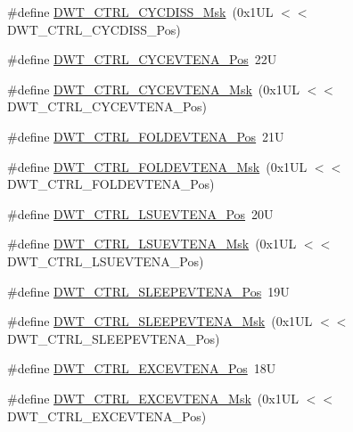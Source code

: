 \begin{DoxyCompactItemize}
\item 
\#define \mbox{\hyperlink{group___c_m_s_i_s___d_w_t_ga688a3b9ecd2a044f2da3280367476271}{D\+W\+T\+\_\+\+C\+T\+R\+L\+\_\+\+C\+Y\+C\+D\+I\+S\+S\+\_\+\+Msk}}~(0x1\+U\+L $<$$<$ D\+W\+T\+\_\+\+C\+T\+R\+L\+\_\+\+C\+Y\+C\+D\+I\+S\+S\+\_\+\+Pos)
\item 
\#define \mbox{\hyperlink{group___c_m_s_i_s___d_w_t_ga0cb0640aaeb18a626d7823570d5c3cb6}{D\+W\+T\+\_\+\+C\+T\+R\+L\+\_\+\+C\+Y\+C\+E\+V\+T\+E\+N\+A\+\_\+\+Pos}}~22U
\item 
\#define \mbox{\hyperlink{group___c_m_s_i_s___d_w_t_ga40554bd81460e39abf08810f45fac1a2}{D\+W\+T\+\_\+\+C\+T\+R\+L\+\_\+\+C\+Y\+C\+E\+V\+T\+E\+N\+A\+\_\+\+Msk}}~(0x1\+U\+L $<$$<$ D\+W\+T\+\_\+\+C\+T\+R\+L\+\_\+\+C\+Y\+C\+E\+V\+T\+E\+N\+A\+\_\+\+Pos)
\item 
\#define \mbox{\hyperlink{group___c_m_s_i_s___d_w_t_ga5602b0707f446ce78d88ff2a3a82bfff}{D\+W\+T\+\_\+\+C\+T\+R\+L\+\_\+\+F\+O\+L\+D\+E\+V\+T\+E\+N\+A\+\_\+\+Pos}}~21U
\item 
\#define \mbox{\hyperlink{group___c_m_s_i_s___d_w_t_ga717e679d775562ae09185a3776b1582f}{D\+W\+T\+\_\+\+C\+T\+R\+L\+\_\+\+F\+O\+L\+D\+E\+V\+T\+E\+N\+A\+\_\+\+Msk}}~(0x1\+U\+L $<$$<$ D\+W\+T\+\_\+\+C\+T\+R\+L\+\_\+\+F\+O\+L\+D\+E\+V\+T\+E\+N\+A\+\_\+\+Pos)
\item 
\#define \mbox{\hyperlink{group___c_m_s_i_s___d_w_t_gaea5d1ee72188dc1d57b54c60a9f5233e}{D\+W\+T\+\_\+\+C\+T\+R\+L\+\_\+\+L\+S\+U\+E\+V\+T\+E\+N\+A\+\_\+\+Pos}}~20U
\item 
\#define \mbox{\hyperlink{group___c_m_s_i_s___d_w_t_gac47427f455fbc29d4b6f8a479169f2b2}{D\+W\+T\+\_\+\+C\+T\+R\+L\+\_\+\+L\+S\+U\+E\+V\+T\+E\+N\+A\+\_\+\+Msk}}~(0x1\+U\+L $<$$<$ D\+W\+T\+\_\+\+C\+T\+R\+L\+\_\+\+L\+S\+U\+E\+V\+T\+E\+N\+A\+\_\+\+Pos)
\item 
\#define \mbox{\hyperlink{group___c_m_s_i_s___d_w_t_ga9c6d62d121164013a8e3ee372f17f3e5}{D\+W\+T\+\_\+\+C\+T\+R\+L\+\_\+\+S\+L\+E\+E\+P\+E\+V\+T\+E\+N\+A\+\_\+\+Pos}}~19U
\item 
\#define \mbox{\hyperlink{group___c_m_s_i_s___d_w_t_ga2f431b3734fb840daf5b361034856da9}{D\+W\+T\+\_\+\+C\+T\+R\+L\+\_\+\+S\+L\+E\+E\+P\+E\+V\+T\+E\+N\+A\+\_\+\+Msk}}~(0x1\+U\+L $<$$<$ D\+W\+T\+\_\+\+C\+T\+R\+L\+\_\+\+S\+L\+E\+E\+P\+E\+V\+T\+E\+N\+A\+\_\+\+Pos)
\item 
\#define \mbox{\hyperlink{group___c_m_s_i_s___d_w_t_gaf4e73f548ae3e945ef8b1d9ff1281544}{D\+W\+T\+\_\+\+C\+T\+R\+L\+\_\+\+E\+X\+C\+E\+V\+T\+E\+N\+A\+\_\+\+Pos}}~18U
\item 
\#define \mbox{\hyperlink{group___c_m_s_i_s___d_w_t_gab7ee0def33423b5859ca4030dff63b58}{D\+W\+T\+\_\+\+C\+T\+R\+L\+\_\+\+E\+X\+C\+E\+V\+T\+E\+N\+A\+\_\+\+Msk}}~(0x1\+U\+L $<$$<$ D\+W\+T\+\_\+\+C\+T\+R\+L\+\_\+\+E\+X\+C\+E\+V\+T\+E\+N\+A\+\_\+\+Pos)

\end{DoxyCompactItemize}
